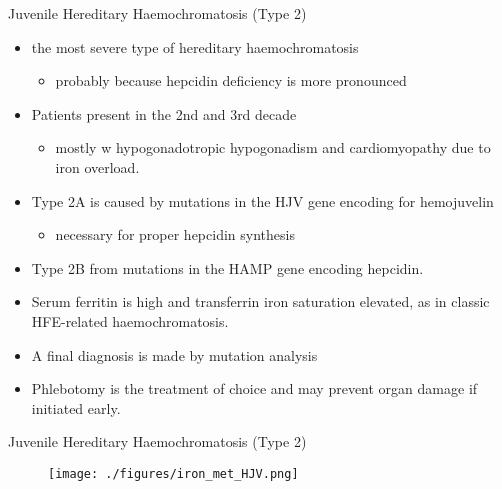 \documentclass[presentation, smaller]{beamer}
\begin{document}
\begin{frame}[label={sec:org90c2c31}]{Juvenile Hereditary Haemochromatosis (Type 2)}
\begin{itemize}
\item the most severe type of hereditary haemochromatosis
\begin{itemize}
\item probably because hepcidin deficiency is more pronounced
\end{itemize}
\item Patients present in the 2nd and 3rd decade
\begin{itemize}
\item mostly w hypogonadotropic hypogonadism and cardiomyopathy due to
iron overload.
\end{itemize}
\item Type 2A is caused by mutations in the HJV gene encoding for hemojuvelin
\begin{itemize}
\item necessary for proper hepcidin synthesis
\end{itemize}
\item Type 2B from mutations in the HAMP gene encoding hepcidin.
\item Serum ferritin is high and transferrin iron saturation elevated, as in classic
HFE-related haemochromatosis.
\item A final diagnosis is made by mutation analysis
\item Phlebotomy is the treatment of choice and may prevent organ damage
if initiated early.
\end{itemize}
\end{frame}


\begin{frame}[label={sec:org4833391}]{Juvenile Hereditary Haemochromatosis (Type 2)}
\begin{figure}[htbp]
\centering
\texttt{[image: ./figures/iron\_met\_HJV.png]}
\label{fig:orgfc022b3}
\end{figure}
\end{frame}
\end{document}

